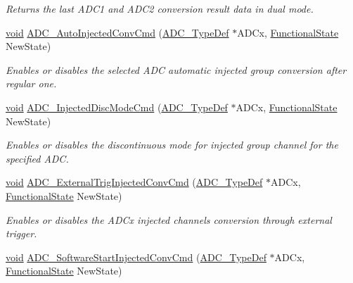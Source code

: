 \begin{DoxyCompactItemize}
\begin{DoxyCompactList}\small\item\em Returns the last A\+D\+C1 and A\+D\+C2 conversion result data in dual mode. \end{DoxyCompactList}\item 
\hyperlink{usb__devapi_8h_afabf60e7f57651d6d595a02c75f07cd0}{void} \hyperlink{group___a_d_c___exported___functions_ga1ff9c3b8e4bbdd2addfd227f1a506a66}{A\+D\+C\+\_\+\+Auto\+Injected\+Conv\+Cmd} (\hyperlink{struct_a_d_c___type_def}{A\+D\+C\+\_\+\+Type\+Def} $\ast$A\+D\+Cx, \hyperlink{agilefox_2library_2inc_2stm32f10x__type_8h_ac9a7e9a35d2513ec15c3b537aaa4fba1}{Functional\+State} New\+State)
\begin{DoxyCompactList}\small\item\em Enables or disables the selected A\+DC automatic injected group conversion after regular one. \end{DoxyCompactList}\item 
\hyperlink{usb__devapi_8h_afabf60e7f57651d6d595a02c75f07cd0}{void} \hyperlink{group___a_d_c___exported___functions_ga0b583b94183fa4ff287177b9ee808092}{A\+D\+C\+\_\+\+Injected\+Disc\+Mode\+Cmd} (\hyperlink{struct_a_d_c___type_def}{A\+D\+C\+\_\+\+Type\+Def} $\ast$A\+D\+Cx, \hyperlink{agilefox_2library_2inc_2stm32f10x__type_8h_ac9a7e9a35d2513ec15c3b537aaa4fba1}{Functional\+State} New\+State)
\begin{DoxyCompactList}\small\item\em Enables or disables the discontinuous mode for injected group channel for the specified A\+DC. \end{DoxyCompactList}\item 
\hyperlink{usb__devapi_8h_afabf60e7f57651d6d595a02c75f07cd0}{void} \hyperlink{group___a_d_c___exported___functions_gad81d134c083d8f407c819e6f4722d553}{A\+D\+C\+\_\+\+External\+Trig\+Injected\+Conv\+Cmd} (\hyperlink{struct_a_d_c___type_def}{A\+D\+C\+\_\+\+Type\+Def} $\ast$A\+D\+Cx, \hyperlink{agilefox_2library_2inc_2stm32f10x__type_8h_ac9a7e9a35d2513ec15c3b537aaa4fba1}{Functional\+State} New\+State)
\begin{DoxyCompactList}\small\item\em Enables or disables the A\+D\+Cx injected channels conversion through external trigger. \end{DoxyCompactList}\item 
\hyperlink{usb__devapi_8h_afabf60e7f57651d6d595a02c75f07cd0}{void} \hyperlink{group___a_d_c___exported___functions_ga5b141d5dbf5f417a11dfa622c8c149d3}{A\+D\+C\+\_\+\+Software\+Start\+Injected\+Conv\+Cmd} (\hyperlink{struct_a_d_c___type_def}{A\+D\+C\+\_\+\+Type\+Def} $\ast$A\+D\+Cx, \hyperlink{agilefox_2library_2inc_2stm32f10x__type_8h_ac9a7e9a35d2513ec15c3b537aaa4fba1}{Functional\+State} New\+State)

\end{DoxyCompactItemize}
